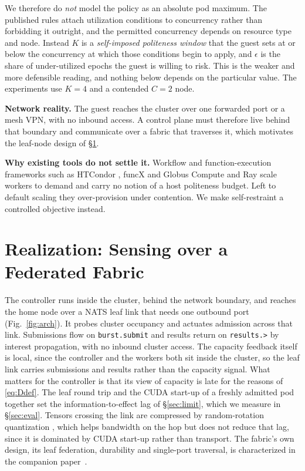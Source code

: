 \documentclass[10pt,conference,letterpaper]{IEEEtran}
\theoremstyle{remark}\newtheorem{remark}{Remark}
\begin{document}
We therefore do \emph{not} model the policy as an absolute pod maximum. The
published rules attach utilization conditions to concurrency rather than
forbidding it outright, and the permitted concurrency depends on resource type
and node. Instead $K$ is a \emph{self-imposed politeness window} that the guest
sets at or below the concurrency at which those conditions begin to apply, and
$\epsilon$ is the share of under-utilized epochs the guest is willing to risk.
This is the weaker and more defensible reading, and nothing below depends on the
particular value. The experiments use $K{=}4$ and a contended $C{=}2$ node.

\textbf{Network reality.} The guest reaches the cluster over one forwarded port
or a mesh VPN, with no inbound access. A control plane must therefore live behind
that boundary and communicate over a fabric that traverses it, which motivates
the leaf-node design of \S\ref{sec:fabric}.

\textbf{Why existing tools do not settle it.} Workflow and function-execution
frameworks such as HTCondor \cite{htcondor}, funcX and Globus Compute
\cite{funcx} and Ray \cite{ray} scale workers to demand and carry no notion of a
host politeness budget. Left to
default scaling they over-provision under contention. We make self-restraint a
controlled objective instead.



\section{Realization: Sensing over a Federated Fabric}
\label{sec:fabric}
The controller runs inside the cluster, behind the network boundary, and reaches
the home node over a NATS \cite{nats} leaf link that needs one outbound port
(Fig.~\ref{fig:arch}). It probes cluster occupancy and actuates admission across
that link. Submissions flow on \texttt{burst.submit} and results return on
\texttt{results.>} by interest propagation, with no inbound cluster access. The capacity feedback itself is local, since the controller and the workers both
sit inside the cluster, so the leaf link carries submissions and results rather
than the capacity signal. What matters for the controller is that its view of
capacity is late for the reasons of \eqref{eq:Ddef}. The leaf round trip and the
CUDA start-up of a freshly admitted pod together set the information-to-effect lag
of \S\ref{sec:limit}, which we measure in \S\ref{sec:eval}. Tensors crossing the
link are compressed by random-rotation quantization
\cite{turboquantpro,turboquant}, which helps bandwidth on the hop but does not
reduce that lag, since it is dominated by CUDA start-up rather than transport. The fabric's own design, its leaf federation, durability and
single-port traversal, is characterized in the companion paper~\cite{companion}.
\end{document}
